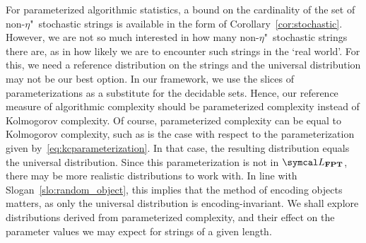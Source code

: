 For parameterized algorithmic statistics, a bound on the cardinality of the set of non-$\eta$"~stochastic strings is available in the form of Corollary~\ref{cor:stochastic}.
However, we are not so much interested in how many non-$\eta$"~stochastic strings there are, as in how likely we are to encounter such strings in the \enquote*{real world}.
For this, we need a reference distribution on the strings and the universal distribution may not be our best option.
In our framework, we use the slices of parameterizations as a substitute for the decidable sets.
Hence, our reference measure of algorithmic complexity should be parameterized complexity instead of Kolmogorov complexity.
Of course, parameterized complexity can be equal to Kolmogorov complexity, such as is the case with respect to the parameterization given by~\eqref{eq:kcparameterization}.
In that case, the resulting distribution equals the universal distribution.
Since this parameterization is not in $\calL_\cl{FPT}$, there may be more realistic distributions to work with.
In line with Slogan~\ref{slo:random_object}, this implies that the method of encoding objects matters, as only the universal distribution is encoding-invariant.
We shall explore distributions derived from parameterized complexity, and their effect on the parameter values we may expect for strings of a given length.

